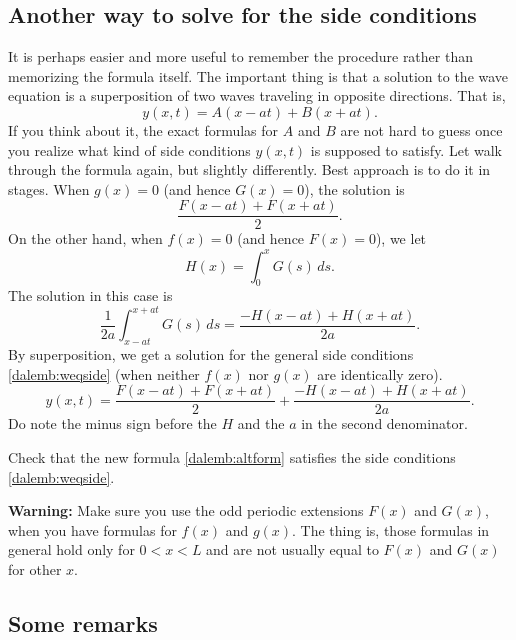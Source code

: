 \subsection{Another way to solve for the side conditions}

It is perhaps easier and more useful
to remember the procedure rather than memorizing the formula
itself.  The important thing is that a solution to the wave
equation is a superposition of two waves traveling in opposite directions.
That is,
\begin{equation*}
y(x,t) = A(x-at) + B(x+at) .
\end{equation*}
If you think about it, the exact formulas for $A$ and $B$ are not hard
to guess once you realize what kind of side conditions $y(x,t)$ is supposed to
satisfy.  Let walk through the formula again, but slightly differently.
Best approach is to do it in stages.  When $g(x) = 0$ (and hence
$G(x) = 0$), the solution is
\begin{equation*}
\frac{ F(x-at) + F(x+at) }{2} .
\end{equation*}
On the other hand,
when $f(x) = 0$ (and hence $F(x) = 0$), we let
\begin{equation*}
H(x) = \int_0^x G(s) \,ds .
\end{equation*}
The solution in this case is
\begin{equation*}
\frac{1}{2a} \int_{x-at}^{x+at} G(s) \,ds
=
\frac{ -H(x-at) + H(x+at) }{2a} .
\end{equation*}
By superposition, we get a solution for the general side conditions
\eqref{dalemb:weqside} (when neither $f(x)$ nor $g(x)$ are identically zero).
\begin{equation} \label{dalemb:altform}
y(x,t) = \frac{ F(x-at) + F(x+at) }{2} +
\frac{ -H(x-at) + H(x+at) }{2a} .
\end{equation}
Do note the minus sign before the $H$ and the $a$ in the second denominator.

\begin{exercise}
Check that the new formula \eqref{dalemb:altform} satisfies
the side conditions
\eqref{dalemb:weqside}.
\end{exercise}

\textbf{Warning:}
Make sure you use the odd periodic extensions $F(x)$ and $G(x)$,
when you have formulas for $f(x)$ and $g(x)$.
The thing is, those formulas in general hold
only for $0 < x < L$ and are not usually equal to $F(x)$ and $G(x)$
for other $x$.

\subsection{Some remarks}

